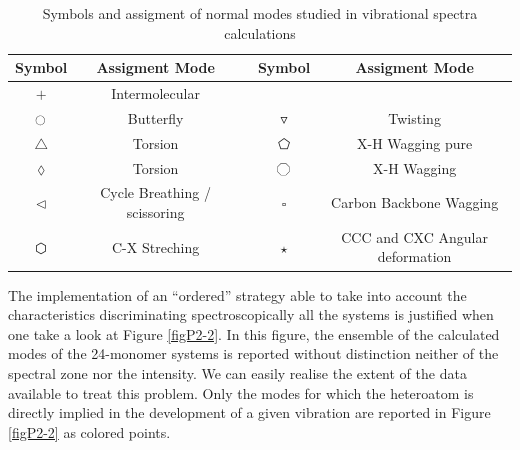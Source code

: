 	\begin{table}[htbp]
		\caption{Symbols and assigment of normal modes studied in vibrational spectra calculations} \label{Table-P2S}
		\begin{center}
			\begin{tabular}{c c c c c}
				\toprule
				\textbf{Symbol} & \textbf{Assigment Mode} & & \textbf{Symbol} & \textbf{Assigment Mode} \\
				\midrule
				\textbf{$ + $} & Intermolecular &  &  &  \\
				\textbf{$\ocircle$} & Butterfly & & \textbf{$\triangledown$} & Twisting  \\
				\textbf{$\triangle$} & Torsion& & 
				 \textbf{$\pentagon$} & X-H Wagging pure \\
				\textbf{$\lozenge$} &   Torsion  &   & \textbf{$\octagon$}   & X-H Wagging  \\
				\textbf{$\lhd$} & Cycle Breathing / scissoring &  & \textbf{$\square$} & Carbon Backbone Wagging \\
				\textbf{$\varhexagon$} & C-X Streching & &\textbf{$\star$} & CCC and CXC Angular deformation\\
				\bottomrule
			\end{tabular}
		\end{center}
	\end{table}
	
	The implementation of an “ordered” strategy able to take into account the characteristics discriminating spectroscopically all the systems is justified when one take a look at Figure \ref{figP2-2}. In this figure, the ensemble of the calculated modes of the 24-monomer systems is reported without distinction neither of the spectral zone nor the intensity. We can easily realise the extent of the data available to treat this problem. Only the modes for which the heteroatom is directly implied  in the development of a given vibration are reported in Figure \ref{figP2-2} as colored points.
	
